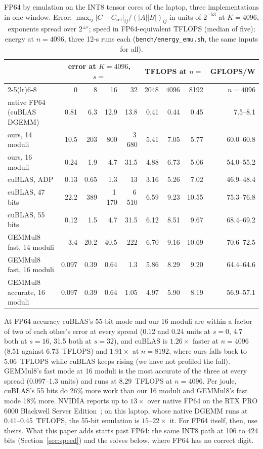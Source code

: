 \begin{table}[h]\centering
\caption{FP64 by emulation on the INT8 tensor cores of the laptop, three implementations in one window. Error:
$\max_{ij}|C-C_{\mathrm{ref}}|_{ij}/(|A||B|)_{ij}$ in units of $2^{-53}$ at $K=4096$, exponents spread over $2^{\pm s}$;
speed in FP64-equivalent TFLOPS (median of five); energy at $n=4096$, three 12-s runs each (\texttt{bench/energy\_emu.sh},
the same inputs for all).}\label{tab:emu}
\small\setlength{\tabcolsep}{3.2pt}
\begin{tabular}{lrrrrrrrr}\toprule
& \multicolumn{4}{c}{error at $K=4096$, $s=$} & \multicolumn{3}{c}{TFLOPS at $n=$} & GFLOPS/W \\
\cmidrule(lr){2-5}\cmidrule(lr){6-8}
& 0 & 8 & 16 & 32 & 2048 & 4096 & 8192 & $n=4096$ \\\midrule
native FP64 (cuBLAS DGEMM) & 0.81 & 6.3 & 12.9 & 13.8 & 0.41 & 0.44 & 0.45 & 7.5--8.1 \\
ours, 14 moduli & 10.5 & 203 & 800 & 3\,680 & 5.41 & 7.05 & 5.77 & 60.0--60.8 \\
ours, 16 moduli & 0.24 & 1.9 & 4.7 & 31.5 & 4.88 & 6.73 & 5.06 & 54.0--55.2 \\
cuBLAS, ADP & 0.13 & 0.65 & 1.3 & 13 & 3.16 & 5.26 & 7.02 & 46.9--48.4 \\
cuBLAS, 47 bits & 22.2 & 389 & 1\,170 & 6\,510 & 6.59 & 9.23 & 10.55 & 75.3--76.8 \\
cuBLAS, 55 bits & 0.12 & 1.5 & 4.7 & 31.5 & 6.12 & 8.51 & 9.67 & 68.4--69.2 \\
GEMMul8 fast, 14 moduli & 3.4 & 20.2 & 40.5 & 222 & 6.70 & 9.16 & 10.69 & 70.6--72.5 \\
GEMMul8 fast, 16 moduli & 0.097 & 0.39 & 0.64 & 1.3 & 5.86 & 8.29 & 9.20 & 64.4--64.6 \\
GEMMul8 accurate, 16 moduli & 0.097 & 0.39 & 0.64 & 1.05 & 4.97 & 5.90 & 8.19 & 56.9--57.1 \\\bottomrule
\end{tabular}
\end{table}
At FP64 accuracy cuBLAS's 55-bit mode and our 16 moduli are within a factor of two of each other's error at every spread
(0.12 and 0.24 units at $s=0$, 4.7 both at $s=16$, 31.5 both at $s=32$), and cuBLAS is $1.26\times$ faster at $n=4096$
(8.51 against 6.73~TFLOPS) and $1.91\times$ at $n=8192$, where ours falls back to 5.06~TFLOPS while cuBLAS keeps rising (we
have not profiled the fall). GEMMul8's fast mode at 16 moduli is the most accurate of the three at every spread (0.097--1.3
units) and runs at 8.29~TFLOPS at $n=4096$. Per joule, cuBLAS's 55 bits do 26\% more work than our 16 moduli and GEMMul8's
fast mode 18\% more. NVIDIA reports up to $13\times$ over native FP64 on the RTX PRO 6000 Blackwell Server Edition~\cite{nvemu};
on this laptop, whose native DGEMM runs at 0.41--0.45~TFLOPS, the 55-bit emulation is $15$--$22\times$ it. For FP64 itself,
then, use theirs. What this paper adds starts past FP64: the same INT8 path at 106 to 424 bits (Section~\ref{sec:speed}) and the solves below,
where FP64 has no correct digit.

